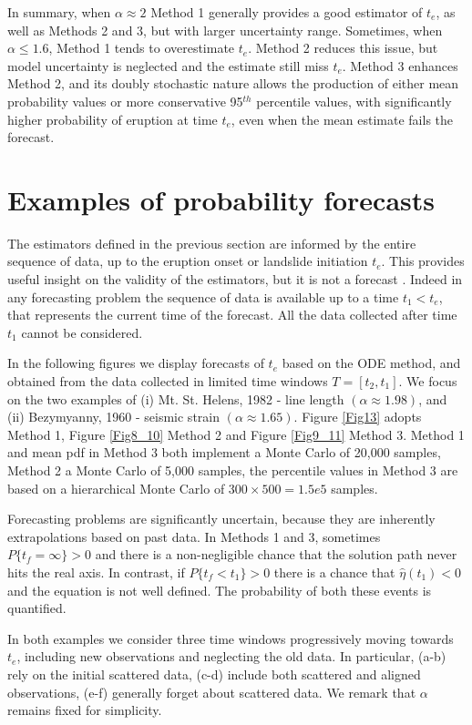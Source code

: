 \documentclass{article}
\begin{document}
In summary, when $\alpha\approx 2$ Method 1 generally provides a good estimator of $t_e$, as well as Methods 2 and 3, but with larger uncertainty range. Sometimes, when $\alpha \le 1.6$, Method 1 tends to overestimate $t_e$. Method 2 reduces this issue, but model uncertainty is neglected and the estimate still miss $t_e$. Method 3 enhances Method 2, and its doubly stochastic nature allows the production of either mean probability values or more conservative 95$^{th}$ percentile values, with significantly higher probability of eruption at time $t_e$, even when the mean estimate fails the forecast.

\section{Examples of probability forecasts}
The estimators defined in the previous section are informed by the entire sequence of data, up to the eruption onset or landslide initiation $t_e$. This provides useful insight on the validity of the estimators, but it is not a forecast \citep{Boue2015}. Indeed in any forecasting problem the sequence of data is available up to a time $t_1<t_e$, that represents the current time of the forecast. All the data collected after time $t_1$ cannot be considered.

In the following figures we display forecasts of $t_e$ based on the ODE method, and obtained from the data collected in limited time windows $T=[t_2,t_1]$. We focus on the two examples of (i) Mt. St. Helens, 1982 - line length $(\alpha\approx1.98)$, and (ii) Bezymyanny, 1960 - seismic strain $(\alpha\approx1.65)$. Figure \ref{Fig13} adopts Method 1, Figure \ref{Fig8_10} Method 2 and Figure \ref{Fig9_11} Method 3. Method 1 and mean pdf in Method 3 both implement a Monte Carlo of 20,000 samples, Method 2 a Monte Carlo of 5,000 samples, the percentile values in Method 3 are based on a hierarchical Monte Carlo of $300\times 500=1.5e5$ samples.

Forecasting problems are significantly uncertain, because they are inherently extrapolations based on past data. In Methods 1 and 3, sometimes $P\{t_f=\infty\} >0$ and there is a non-negligible chance that the solution path never hits the real axis. In contrast, if $P\{t_f<t_1\} >0$ there is a chance that $\hat\eta(t_1)<0$ and the equation is not well defined. The probability of both these events is quantified.

In both examples we consider three time windows progressively moving towards $t_e$, including new observations and neglecting the old data. In particular, (a-b) rely on the initial scattered data, (c-d) include both scattered and aligned observations, (e-f) generally forget about scattered data. We remark that $\alpha$ remains fixed for simplicity.
\end{document}
